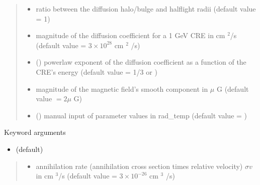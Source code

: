 \documentclass[letterpaper,10pt,english]{sphinxmanual}
\begin{document}
\begin{fulllineitems}
\begin{quote}
\begin{description}
\begin{itemize}
\item {} 
\sphinxAtStartPar
{} \textendash{} ratio between the diffusion halo/bulge and half\sphinxhyphen{}light radii (default value = 1)

\item {} 
\sphinxAtStartPar
{} \textendash{} magnitude of the diffusion coefficient for a 1 GeV CRE in cm \({}^2\)/s (default value = \(3\times 10^{28}\) cm \({}^2\) /s)

\item {} 
\sphinxAtStartPar
{} (\sphinxstyleliteralemphasis{\sphinxupquote{, }}) \textendash{} power\sphinxhyphen{}law exponent of the diffusion coefficient as a function of the CRE’s energy (default value = 1/3 or )

\item {} 
\sphinxAtStartPar
{} \textendash{} magnitude of the magnetic field’s smooth component in \(\mu\) G (default value \(= 2 \mu\) G)

\item {} 
\sphinxAtStartPar
{} () \textendash{} manual input of parameter values in rad\_temp (default value = )

\end{itemize}

\end{description}\end{quote}

\sphinxAtStartPar
Keyword arguments
\begin{itemize}
\item {} 
\sphinxAtStartPar
{}    (default)

\end{itemize}
\begin{quote}\begin{description}
\begin{itemize}
\item {} 
\sphinxAtStartPar
{} \textendash{} annihilation rate (annihilation cross section times relative velocity) \(\sigma v\) in cm \({}^3\)/s (default value = \(3 \times 10^{-26}\) cm \({}^3\) /s)


\end{itemize}
\end{description}
\end{quote}
\end{fulllineitems}
\end{document}

